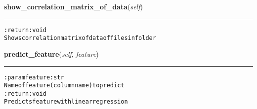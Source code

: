     \vspace{0.5ex}

\hspace{.8\funcindent}\begin{boxedminipage}{\funcwidth}

    \raggedright \textbf{show\_correlation\_matrix\_of\_data}(\textit{self})

    \vspace{-1.5ex}

    \rule{\textwidth}{0.5\fboxrule}
\setlength{\parskip}{2ex}
\begin{alltt}

:return: void
    Shows correlation matrix of data of files in folder
\end{alltt}

\setlength{\parskip}{1ex}
    \end{boxedminipage}

    \label{pygce:analysis:models:TimelineDataAnalysis:predict_feature}

    \vspace{0.5ex}

\hspace{.8\funcindent}\begin{boxedminipage}{\funcwidth}

    \raggedright \textbf{predict\_feature}(\textit{self}, \textit{feature})

    \vspace{-1.5ex}

    \rule{\textwidth}{0.5\fboxrule}
\setlength{\parskip}{2ex}
\begin{alltt}

:param feature: str
    Name of feature (column name) to predict
:return: void
    Predicts feature with linear regression
\end{alltt}

\setlength{\parskip}{1ex}
    \end{boxedminipage}

    \label{pygce:analysis:models:TimelineDataAnalysis:cluster_analyze}

